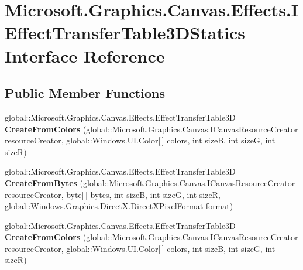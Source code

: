 \hypertarget{interface_microsoft_1_1_graphics_1_1_canvas_1_1_effects_1_1_i_effect_transfer_table3_d_statics}{}\section{Microsoft.\+Graphics.\+Canvas.\+Effects.\+I\+Effect\+Transfer\+Table3\+D\+Statics Interface Reference}
\label{interface_microsoft_1_1_graphics_1_1_canvas_1_1_effects_1_1_i_effect_transfer_table3_d_statics}
\subsection*{Public Member Functions}
\begin{DoxyCompactItemize}
\item 
\mbox{\label{interface_microsoft_1_1_graphics_1_1_canvas_1_1_effects_1_1_i_effect_transfer_table3_d_statics_ac91fd90ed33239f56927bf545d88da2a}} 
global\+::\+Microsoft.\+Graphics.\+Canvas.\+Effects.\+Effect\+Transfer\+Table3D {\bfseries Create\+From\+Colors} (global\+::\+Microsoft.\+Graphics.\+Canvas.\+I\+Canvas\+Resource\+Creator resource\+Creator, global\+::\+Windows.\+U\+I.\+Color\mbox{[}$\,$\mbox{]} colors, int sizeB, int sizeG, int sizeR)
\item 
\mbox{\label{interface_microsoft_1_1_graphics_1_1_canvas_1_1_effects_1_1_i_effect_transfer_table3_d_statics_ac1a661dd1e7abbf576d8ff78f4e17171}} 
global\+::\+Microsoft.\+Graphics.\+Canvas.\+Effects.\+Effect\+Transfer\+Table3D {\bfseries Create\+From\+Bytes} (global\+::\+Microsoft.\+Graphics.\+Canvas.\+I\+Canvas\+Resource\+Creator resource\+Creator, byte\mbox{[}$\,$\mbox{]} bytes, int sizeB, int sizeG, int sizeR, global\+::\+Windows.\+Graphics.\+Direct\+X.\+Direct\+X\+Pixel\+Format format)
\item 
\mbox{\label{interface_microsoft_1_1_graphics_1_1_canvas_1_1_effects_1_1_i_effect_transfer_table3_d_statics_ac91fd90ed33239f56927bf545d88da2a}} 
global\+::\+Microsoft.\+Graphics.\+Canvas.\+Effects.\+Effect\+Transfer\+Table3D {\bfseries Create\+From\+Colors} (global\+::\+Microsoft.\+Graphics.\+Canvas.\+I\+Canvas\+Resource\+Creator resource\+Creator, global\+::\+Windows.\+U\+I.\+Color\mbox{[}$\,$\mbox{]} colors, int sizeB, int sizeG, int sizeR)

\end{DoxyCompactItemize}
